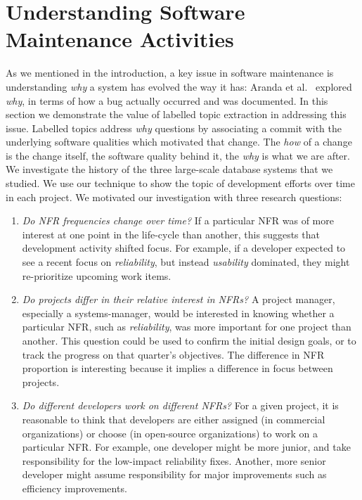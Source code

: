 \documentclass[smallextended]{svjour3}       %
\begin{document}
\section{Understanding Software Maintenance Activities} 
\label{sec:analysis}
As we mentioned in the introduction, a key issue in software
maintenance is understanding \emph{why} a system has evolved the way
it has: Aranda et al.~\cite{aranda09icse} explored \emph{why}, in
terms of how a bug actually occurred and was documented.
In this section we demonstrate the value of labelled topic extraction
in addressing this issue. 
Labelled topics address \emph{why} questions by associating a commit with the underlying software qualities which motivated that change.
The \emph{how} of a change is the change itself, the software quality behind it, the
\emph{why} is what we are after.
We investigate the history of the three large-scale database systems that we studied. 
We use our technique to show the topic of development efforts over time in each project.
We motivated our investigation with three research questions:
\renewcommand{\labelenumi}{\textbf{RQ\arabic{enumi}. }}
\begin{enumerate}
\item \emph{Do NFR frequencies change over time?} If a particular NFR
  was of more interest at one point in the life-cycle than another,
  this suggests that development activity shifted focus. For example,
  if a developer expected to see a recent focus on \emph{reliability},
  but instead \emph{usability} dominated, they might re-prioritize
  upcoming work items.

\item \emph{Do projects differ in their relative interest in NFRs?} A
  project manager, especially a systems-manager, would be interested
  in knowing whether a particular NFR, such as \emph{reliability}, was
  more important for one project than another. This question could be used to
  confirm the initial design goals, or to track the progress on that
  quarter's objectives.  The difference in NFR proportion is
  interesting because it implies a difference in focus between projects.

\item \emph{Do different developers work on different NFRs?} For a given project, it is reasonable to think that developers are either assigned
(in commercial organizations) or choose (in open-source organizations) to work on a particular NFR. For example, one developer might be more junior, and take
responsibility for the low-impact reliability fixes. Another, more senior developer might assume responsibility for major improvements such as efficiency
improvements. 

\end{enumerate}
\end{document}
